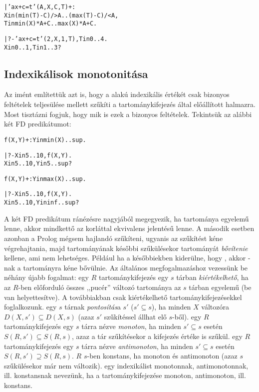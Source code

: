 \begin{alltt}
| 'ax+c=t'(A,X,C,T) +:  % feltétel: A > 0
        X in (min(T) - C) /> A .. (max(T) - C) /< A,
        T in min(X)*A + C      ..  max(X)*A + C.

| ?- 'ax+c=t'(2,X,1,T), T in 0..4.
X in 0..1, T in 1..3 ?
\end{alltt}

\subsection{Indexikálisok monotonitása}

Az imént említettük azt is, hogy a  alakú indexikális
 értékét csak bizonyos feltételek teljesülése mellett szűkíti
a  tartománykifejezés által előállított halmazra. Most tisztázni fogjuk,
hogy mik is ezek a bizonyos feltételek. Tekintsük az alábbi két FD predikátumot:

\begin{alltt}
f(X, Y) +: Y in min(X)..sup.

| ?- X in 5..10, f(X, Y).
X in 5..10, Y in 5..sup?

f(X, Y) +: Y in max(X)..sup.

| ?- X in 5..10, f(X, Y).
X in 5..10, Y in inf..sup?
\end{alltt}

A két FD predikátum ránézésre nagyjából megegyezik, ha  tartománya egyelemű
lenne, akkor mindkettő az  korláttal ekvivalens jelentésű lenne. A második
esetben azonban a Prolog mégsem hajlandó szűkíteni, ugyanis az 
szűkítést kéne végrehajtania, majd  tartományának későbbi szűkülésekor 
tartományát \emph{bővítenie} kellene, ami nem lehetséges. Például ha a későbbiekben
kiderülne, hogy , akkor -nak a  tartományra kéne
bővülnie.
\br
Az általános megfogalmazáshoz vezessünk be néhány újabb fogalmat:
\br
{} egy $R$ tartománykifejezés egy $s$ tárban \emph{kiértékelhető}, ha az
$R$-ben előforduló összes ,,pucér'' változó tartománya az $s$ tárban
egyelemű (be van helyettesítve). A továbbiakban csak kiértékelhető
tartománykifejezésekkel foglalkozunk.
\br
{} egy $s$ tárnak \emph{pontosítás}a $s'$ ($s' \subseteq s$), ha minden
$X$ változóra $D(X,s') \subseteq D(X,s)$ (azaz $s'$ szűkítéssel állhat elő $s$-ből).
\br
{} egy $R$ tartománykifejezés egy $s$ tárra nézve \emph{monoton}, ha
minden $s' \subseteq s$ esetén $S(R,s') \subseteq S(R,s)$, azaz a tár
szűkítésekor a kifejezés értéke is szűkül.
\br
{} egy $R$ tartománykifejezés egy $s$ tárra nézve \emph{antimonoton}, ha
minden $s' \subseteq s$ esetén $S(R,s') \supseteq S(R,s)$.
\br
{} $R$ $s$-ben konstans, ha monoton és antimonoton (azaz $s$ szűkülésekor
már nem változik).
\br
{} egy indexikálist monotonnak, antimonotonnak, ill. konstansnak nevezünk,
ha a tartománykifejezése monoton, antimonoton, ill. konstans.


